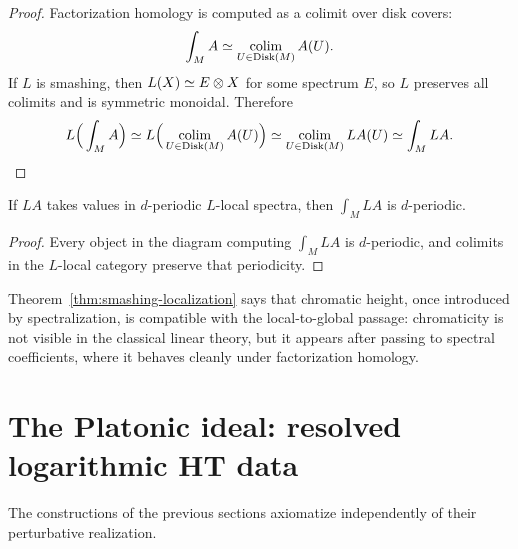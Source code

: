 \begin{proof}
Factorization homology is computed as a colimit over disk covers:
\[
 \int_M A \simeq \operatorname*{colim}_{U\in \mathrm{Disk}(M)} A(U).
\]
If $L$ is smashing, then $L(X)\simeq E\otimes X$ for some spectrum $E$, so $L$ preserves all colimits and is symmetric monoidal. Therefore
\[
 L\Big(\int_M A\Big)
 \simeq
 L\Big(\operatorname*{colim}_{U\in \mathrm{Disk}(M)}A(U)\Big)
 \simeq
 \operatorname*{colim}_{U\in \mathrm{Disk}(M)}LA(U)
 \simeq
 \int_M LA.
\]
\end{proof}

\begin{corollary}\label{cor:periodicity}
If $LA$ takes values in $d$-periodic $L$-local spectra, then $\int_M LA$ is $d$-periodic.
\end{corollary}

\begin{proof}
Every object in the diagram computing $\int_M LA$ is $d$-periodic, and colimits in the $L$-local category preserve that periodicity.
\end{proof}

\begin{remark}[Chromaticity]
Theorem~\ref{thm:smashing-localization} says that chromatic height, once introduced by spectralization, is compatible with the local-to-global passage: chromaticity is not visible in the classical linear theory, but it appears after passing to spectral coefficients, where it behaves cleanly under factorization homology.
\end{remark}

\section{The Platonic ideal: resolved logarithmic HT data}\label{sec:platonic}

The constructions of the previous sections axiomatize independently of their perturbative realization.

